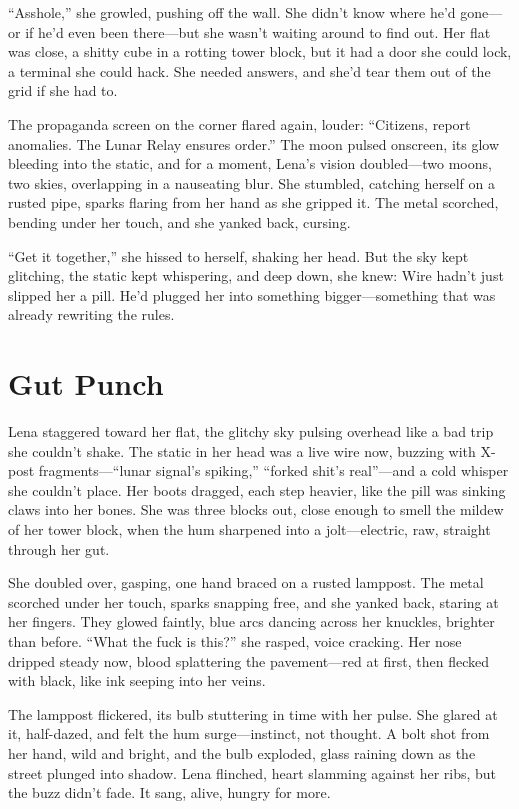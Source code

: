 \documentclass[12pt]{book}
\begin{document}
``Asshole,'' she growled, pushing off the wall. She didn’t know where he’d gone---or if he’d even been there---but she wasn’t waiting around to find out. Her flat was close, a shitty cube in a rotting tower block, but it had a door she could lock, a terminal she could hack. She needed answers, and she’d tear them out of the grid if she had to.

The propaganda screen on the corner flared again, louder: ``Citizens, report anomalies. The Lunar Relay ensures order.'' The moon pulsed onscreen, its glow bleeding into the static, and for a moment, Lena’s vision doubled---two moons, two skies, overlapping in a nauseating blur. She stumbled, catching herself on a rusted pipe, sparks flaring from her hand as she gripped it. The metal scorched, bending under her touch, and she yanked back, cursing.

``Get it together,'' she hissed to herself, shaking her head. But the sky kept glitching, the static kept whispering, and deep down, she knew: Wire hadn’t just slipped her a pill. He’d plugged her into something bigger---something that was already rewriting the rules.

\section{Gut Punch}

Lena staggered toward her flat, the glitchy sky pulsing overhead like a bad trip she couldn’t shake. The static in her head was a live wire now, buzzing with X-post fragments---``lunar signal's spiking,'' ``forked shit's real''---and a cold whisper she couldn’t place. Her boots dragged, each step heavier, like the pill was sinking claws into her bones. She was three blocks out, close enough to smell the mildew of her tower block, when the hum sharpened into a jolt---electric, raw, straight through her gut.

She doubled over, gasping, one hand braced on a rusted lamppost. The metal scorched under her touch, sparks snapping free, and she yanked back, staring at her fingers. They glowed faintly, blue arcs dancing across her knuckles, brighter than before. ``What the fuck is this?'' she rasped, voice cracking. Her nose dripped steady now, blood splattering the pavement---red at first, then flecked with black, like ink seeping into her veins.

The lamppost flickered, its bulb stuttering in time with her pulse. She glared at it, half-dazed, and felt the hum surge---instinct, not thought. A bolt shot from her hand, wild and bright, and the bulb exploded, glass raining down as the street plunged into shadow. Lena flinched, heart slamming against her ribs, but the buzz didn’t fade. It sang, alive, hungry for more.
\end{document}
